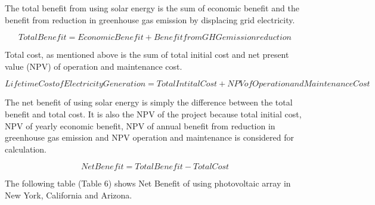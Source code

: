 \documentclass[12pt]{article}
\begin{document}
\vspace{\baselineskip}
\begin{justify}
The total benefit from using solar energy is the sum of economic benefit and the benefit from reduction in greenhouse gas emission by displacing grid electricity. 
\end{justify}\par

\begin{justify}
 \[ Total Benefit=Economic Benefit+Benefit from GHG emission reduction  \] 
\end{justify}\par

\begin{justify}
Total cost, as mentioned above is the sum of total initial cost and net present value (NPV) of operation and maintenance cost.
\end{justify}\par

\begin{justify}
 \[ Lifetime Cost of Electricity Generation=Total Intital Cost+NPV of Operation and Maintenance Cost \] 
\end{justify}\par

\begin{justify}
The net benefit of using solar energy is simply the difference between the total benefit and total cost. It is also the NPV of the project because total initial cost, NPV of yearly economic benefit, NPV of annual benefit from reduction in greenhouse gas emission and NPV operation and maintenance is considered for calculation.
\end{justify}\par

\begin{justify}
 \[ Net Benefit=Total Benefit-Total Cost \] 
\end{justify}\par

\begin{justify}
The following table (Table 6) shows Net Benefit of using photovoltaic array in New York, California and Arizona.
\end{justify}\par


\vspace{\baselineskip}
\par



\end{document}
